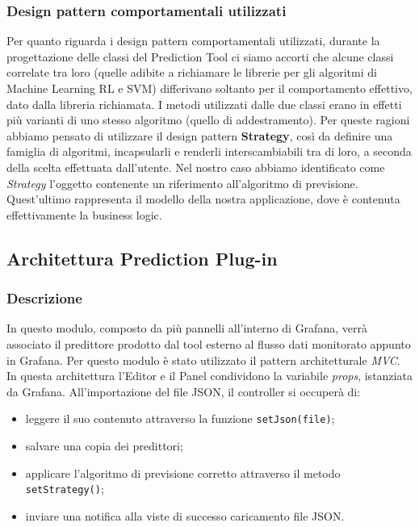 \subsubsection{Design pattern comportamentali utilizzati}
Per quanto riguarda i design pattern comportamentali utilizzati, durante la progettazione delle classi del Prediction Tool ci siamo accorti che alcune classi correlate tra loro (quelle adibite a richiamare le librerie per gli algoritmi di Machine Learning RL e SVM) differivano soltanto per il comportamento effettivo, dato dalla libreria richiamata. I metodi utilizzati dalle due classi erano in effetti più varianti di uno stesso algoritmo (quello di addestramento). Per queste ragioni abbiamo pensato di utilizzare il design pattern \textbf{Strategy}, così da definire una famiglia di algoritmi, incapsularli e renderli interscambiabili tra di loro, a seconda della scelta effettuata dall’utente.
Nel nostro caso abbiamo identificato come \textit{Strategy} l’oggetto contenente un riferimento all'algoritmo di previsione.
Quest'ultimo rappresenta il modello della nostra applicazione, dove è contenuta effettivamente la business logic.

\pagebreak
\subsection{Architettura Prediction Plug-in}

\subsubsection{Descrizione}
In questo modulo, composto da più pannelli all'interno di Grafana, verrà associato il predittore prodotto dal tool esterno al flusso dati monitorato appunto in Grafana. Per questo modulo è stato utilizzato il pattern architetturale \textit{MVC}.
In questa architettura l’Editor e il Panel condividono la variabile \textit{props}, istanziata da Grafana. 
All’importazione del file JSON, il controller si occuperà di: \begin{itemize}
\item leggere il suo contenuto attraverso la funzione \texttt{setJson(file)};
\item salvare una copia dei predittori;
\item applicare l'algoritmo di previsione corretto attraverso il metodo \texttt{setStrategy()};
\item inviare una notifica alla viste di successo caricamento file JSON.
\end{itemize}

